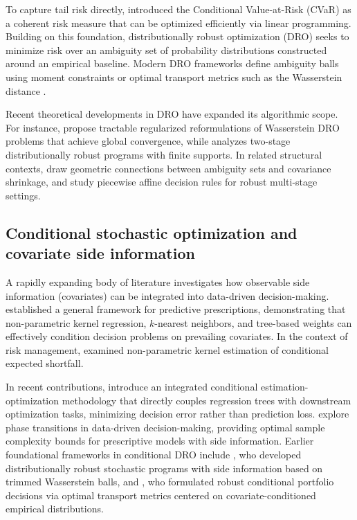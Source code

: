\documentclass[smallcondensed]{svjour3}
\begin{document}
To capture tail risk directly, \cite{rockafellar2000optimization, rockafellar2002conditional} introduced the Conditional Value-at-Risk (CVaR) as a coherent risk measure that can be optimized efficiently via linear programming. Building on this foundation, distributionally robust optimization (DRO) seeks to minimize risk over an ambiguity set of probability distributions constructed around an empirical baseline. Modern DRO frameworks define ambiguity balls using moment constraints \cite{delage2010distributionally} or optimal transport metrics such as the Wasserstein distance \cite{esfahani2018data}.

Recent theoretical developments in DRO have expanded its algorithmic scope. For instance, \cite{chu2025wasserstein} propose tractable regularized reformulations of Wasserstein DRO problems that achieve global convergence, while \cite{agra2025two} analyzes two-stage distributionally robust programs with finite supports. In related structural contexts, \cite{yue2026geometric} draw geometric connections between ambiguity sets and covariance shrinkage, and \cite{thoma2026piecewise} study piecewise affine decision rules for robust multi-stage settings.

\subsection{Conditional stochastic optimization and covariate side information}
A rapidly expanding body of literature investigates how observable side information (covariates) can be integrated into data-driven decision-making. \cite{bertsimas2020predictive} established a general framework for predictive prescriptions, demonstrating that non-parametric kernel regression, $k$-nearest neighbors, and tree-based weights can effectively condition decision problems on prevailing covariates. In the context of risk management, \cite{scaillet2004nonparametric} examined non-parametric kernel estimation of conditional expected shortfall.

In recent contributions, \cite{qi2026integrated} introduce an integrated conditional estimation-optimization methodology that directly couples regression trees with downstream optimization tasks, minimizing decision error rather than prediction loss. \cite{bennouna2025learning} explore phase transitions in data-driven decision-making, providing optimal sample complexity bounds for prescriptive models with side information. Earlier foundational frameworks in conditional DRO include \cite{esteban2022distributionally}, who developed distributionally robust stochastic programs with side information based on trimmed Wasserstein balls, and \cite{nguyen2025robustifying}, who formulated robust conditional portfolio decisions via optimal transport metrics centered on covariate-conditioned empirical distributions.
\end{document}
